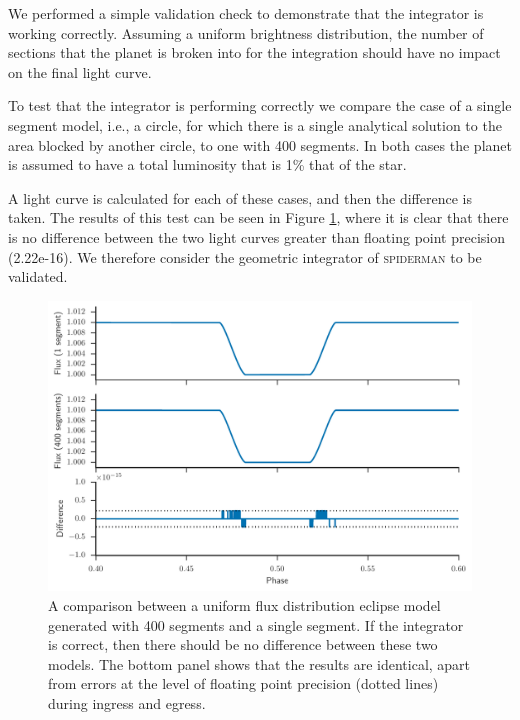 \documentclass[a4paper,fleqn,usenatbib]{mnras}
\begin{document}
We performed a simple validation check to demonstrate that the integrator is working correctly. Assuming a uniform brightness distribution, the number of sections that the planet is broken into for the integration should have no impact on the final light curve.

To test that the integrator is performing correctly we compare the case of a single segment model, i.e., a circle, for which there is a single analytical solution to the area blocked by another circle, to one with 400 segments. In both cases the planet is assumed to have a total luminosity that is 1\% that of the star.

A light curve is calculated for each of these cases, and then the difference is taken. The results of this test can be seen in Figure \ref{fig:precision}, where it is clear that there is no difference between the two light curves greater than floating point precision (2.22e-16). We therefore consider the geometric integrator of \textsc{spiderman} to be validated.

\begin{figure}
\begin{center}
\includegraphics[width=\columnwidth]{img/precision.pdf}
\caption{A comparison between a uniform flux distribution eclipse model generated with 400 segments and a single segment. If the integrator is correct, then there should be no difference between these two models. The bottom panel shows that the results are identical, apart from errors at the level of floating point precision (dotted lines) during ingress and egress.}
\label{fig:precision}
\end{center}
\end{figure}
\end{document}
